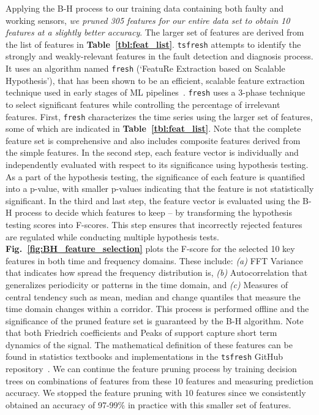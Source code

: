 \documentclass[manuscript]{acmart}
\newcommand{\ca}{{\it (a) }}
\newcommand{\cb}{{\it (b) }}
\newcommand{\cc}{{\it (c) }}
\begin{document}
Applying the B-H process to our training data containing both faulty and working sensors, \emph{we pruned 305 features for our entire data set to obtain 10 features at a slightly better accuracy}. The larger set of features are derived from the list of features in {\bfseries Table~\ref{tbl:feat_list}}. \texttt{tsfresh} attempts to identify the strongly and weakly-relevant features in the fault detection and diagnosis process. It uses an algorithm named \texttt{fresh} (`FeatuRe Extraction based on Scalable Hypothesis'), that has been shown to be an efficient, scalable feature extraction technique used in early stages of ML pipelines~\cite{christ2016distributed, christ2018time}. \texttt{fresh} uses a 3-phase technique to select significant features while controlling the percentage of irrelevant features. First, \texttt{fresh} characterizes the time series using the larger set of features, some of which are indicated in {\bfseries Table~\ref{tbl:feat_list}}. Note that the complete feature set is comprehensive and also includes composite features derived from the simple features. In the second step, each feature vector is individually and independently evaluated with respect to its significance using hypothesis testing. As a part of the hypothesis testing, the significance of each feature is quantified into a p-value, with smaller p-values indicating that the feature is not statistically significant. In the third and last step, the feature vector is evaluated using the B-H process to decide which features to keep -- by transforming the hypothesis testing scores into F-scores. This step ensures that incorrectly rejected features are regulated while conducting multiple hypothesis tests. {\bfseries Fig.~\ref{fig:BH_feature_selection}} plots the F-score for the selected 10 key features in both time and frequency domains. These include: \ca FFT Variance that indicates how spread the frequency distribution is, \cb Autocorrelation that generalizes periodicity or patterns in the time domain, and \cc  Measures of central tendency such as mean, median and change quantiles that measure the time domain changes within a corridor. This process is performed offline and the significance of the pruned feature set is guaranteed by the B-H algorithm. Note that both Friedrich coefficients and Peaks of support capture short term dynamics of the signal. The mathematical definition of these features can be found in statistics textbooks and implementations in the \texttt{tsfresh} GitHub repository~\cite{tsfresh2018code}. We can continue the feature pruning process by training decision trees on combinations of features from these 10 features and measuring prediction accuracy. We stopped the feature pruning with 10 features since we consistently obtained an accuracy of 97-99\% in practice with this smaller set of features.
\end{document}
